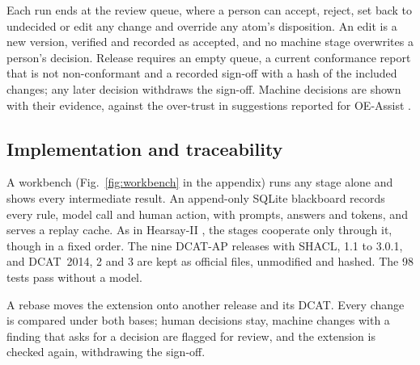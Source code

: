 Each run ends at the review queue, where a person can accept, reject, set back to undecided or edit any change %
and override any atom's disposition. An edit is a new version, verified and recorded as accepted, and no %
machine stage overwrites a person's decision. Release requires an empty queue, a current conformance report that %
is not non-conformant and a recorded sign-off with a hash of the included changes; any later decision withdraws %
the sign-off. Machine decisions are shown with their evidence, against the over-trust in suggestions reported %
for OE-Assist \cite{lippolis2025oeassist}.

\subsection{Implementation and traceability}\label{sec:impl}

A workbench (Fig.~\ref{fig:workbench} in the appendix) runs any stage alone and shows every intermediate result. %
An append-only SQLite blackboard records every rule, model call and human action, with prompts, answers and %
tokens, and serves a replay cache. As in Hearsay-II \cite{erman1980hearsay,nii1986blackboard}, the stages %
cooperate only through it, though in a fixed order. The nine \acs{DCAT-AP} releases with %
\acs{SHACL}, 1.1 to 3.0.1, and \acs{DCAT}~2014, 2 and 3 are kept as official files, unmodified and
hashed. The 98 tests pass without a model. %

A rebase moves the extension onto another release and its \acs{DCAT}. Every change is compared under both bases;
human decisions stay, machine changes with a finding that asks for a decision are flagged for review, and the %
extension is checked again, withdrawing the sign-off.

